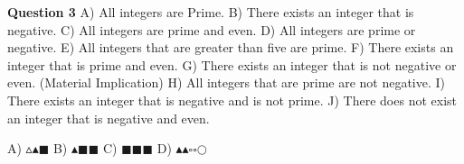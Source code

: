 \documentclass{article}
\begin{document}
\textbf{Question 3}\newline
A)	All integers are Prime.\newline
B)	There exists an integer that is negative.\newline
C)	All integers are prime and even.\newline
D)	All integers are prime or negative.\newline
E)	All integers that are greater than five are prime.\newline
F)	There exists an integer that is prime and even.\newline
G)	There exists an integer that is not negative or even. (Material Implication)\newline
H)	All integers that are prime are not negative.\newline
I)	There exists an integer that is negative and is not prime.\newline
J)	There does not exist an integer that is negative and even.

\enddocument








A)	$\vartriangle$$\blacktriangle$$\blacksquare$\newline
B)	$\blacktriangle$$\blacksquare$$\blacksquare$\newline
C)	$\blacksquare$$\blacksquare$$\blacksquare$\newline
D)	$\blacktriangle$$\blacktriangle$$\square$$\square$$\mathbb{\bigcirc}$
\end{document}
